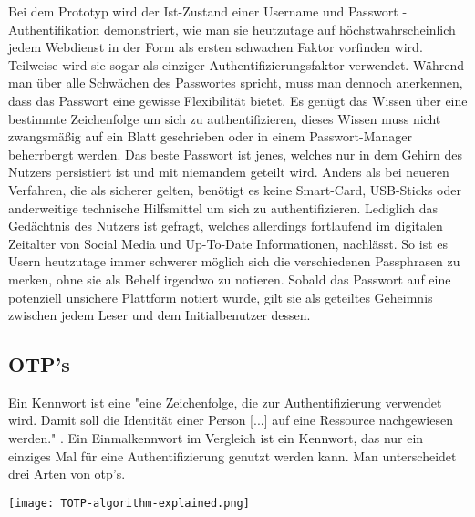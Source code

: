 Bei dem Prototyp wird der Ist-Zustand einer Username und Passwort - Authentifikation demonstriert, wie man sie heutzutage auf höchstwahrscheinlich jedem Webdienst in der Form als ersten schwachen Faktor vorfinden wird. Teilweise wird sie sogar als einziger Authentifizierungsfaktor verwendet. Während man über alle Schwächen des Passwortes spricht, muss man dennoch anerkennen, dass das Passwort eine gewisse Flexibilität bietet. Es genügt das Wissen über eine bestimmte Zeichenfolge um sich zu authentifizieren, dieses Wissen muss nicht zwangsmäßig auf ein Blatt geschrieben oder in einem Passwort-Manager beherrbergt werden. Das beste Passwort ist jenes, welches nur in dem Gehirn des Nutzers persistiert ist und mit niemandem geteilt wird. Anders als bei neueren Verfahren, die als sicherer gelten, benötigt es keine Smart-Card, USB-Sticks oder anderweitige technische Hilfsmittel um sich zu authentifizieren. Lediglich das Gedächtnis des Nutzers ist gefragt, welches allerdings fortlaufend im digitalen Zeitalter von Social Media und Up-To-Date Informationen, nachlässt. So ist es Usern heutzutage immer schwerer möglich sich die verschiedenen Passphrasen zu merken, ohne sie als Behelf irgendwo zu notieren. Sobald das Passwort auf eine potenziell unsichere Plattform notiert wurde, gilt sie als geteiltes Geheimnis zwischen jedem Leser und dem Initialbenutzer dessen.
\newpage

\subsection{OTP's}
Ein Kennwort ist eine "eine Zeichenfolge, die zur Authentifizierung verwendet wird. Damit soll die Identität einer Person [...] auf eine Ressource nachgewiesen werden." \cite{A4}. Ein Einmalkennwort im Vergleich ist ein Kennwort, das nur ein einziges Mal für eine Authentifizierung genutzt werden kann. Man unterscheidet drei Arten von \ac{otp}'s.

\texttt{[image: TOTP-algorithm-explained.png]}

